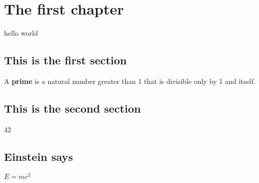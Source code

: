 \chapter{The first chapter}

hello world


\section{This is the first section}

A 
\textbf{prime}
is a natural number greater than 1 that is divisible only by 1 and itself. 


\section{This is the second section}

42


\section{Einstein says}

$E = mc^2$
